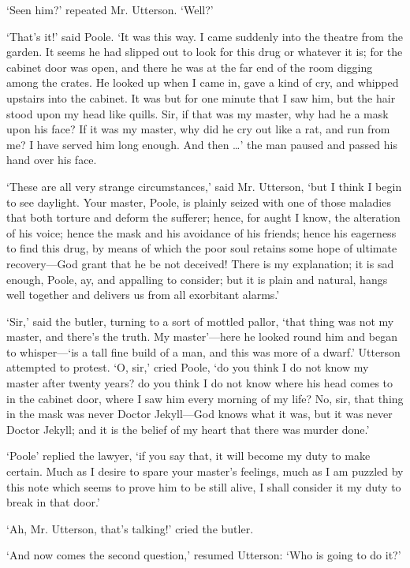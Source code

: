 \documentclass[]{novel}
\begin{document}
‘Seen him?’ repeated Mr. Utterson. ‘Well?’

‘That’s it!’ said Poole. ‘It was this way. I came suddenly into the theatre from the garden. It seems he had slipped out to look for this drug or whatever it is; for the cabinet door was open, and there he was at the far end of the room digging among the crates. He looked up when I came in, gave a kind of cry, and whipped upstairs into the cabinet. It was but for one minute that I saw him, but the hair stood upon my head like quills. Sir, if that was my master, why had he a mask upon his face? If it was my master, why did he cry out like a rat, and run from me? I have served him long enough. And then …’ the man paused and passed his hand over his face.

‘These are all very strange circumstances,’ said Mr. Utterson, ‘but I think I begin to see daylight. Your master, Poole, is plainly seized with one of those maladies that both torture and deform the sufferer; hence, for aught I know, the alteration of his voice; hence the mask and his avoidance of his friends; hence his eagerness to find this drug, by means of which the poor soul retains some hope of ultimate recovery—God grant that he be not deceived! There is my explanation; it is sad enough, Poole, ay, and appalling to consider; but it is plain and natural, hangs well together and delivers us from all exorbitant alarms.’

‘Sir,’ said the butler, turning to a sort of mottled pallor, ‘that thing was not my master, and there’s the truth. My master’—here he looked round him and began to whisper—‘is a tall fine build of a man, and this was more of a dwarf.’ Utterson attempted to protest. ‘O, sir,’ cried Poole, ‘do you think I do not know my master after twenty years? do you think I do not know where his head comes to in the cabinet door, where I saw him every morning of my life? No, sir, that thing in the mask was never Doctor Jekyll—God knows what it was, but it was never Doctor Jekyll; and it is the belief of my heart that there was murder done.’

‘Poole’ replied the lawyer, ‘if you say that, it will become my duty to make certain. Much as I desire to spare your master’s feelings, much as I am puzzled by this note which seems to prove him to be still alive, I shall consider it my duty to break in that door.’

‘Ah, Mr. Utterson, that’s talking!’ cried the butler.

‘And now comes the second question,’ resumed Utterson: ‘Who is going to do it?’
\end{document}
